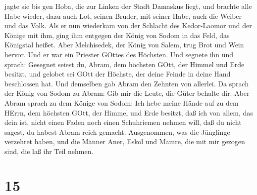 jagte sie bis gen Hoba, die zur Linken der Stadt Damaskus liegt,
 und brachte alle Habe wieder, dazu auch Lot, seinen
Bruder, mit seiner Habe, auch die Weiber und das Volk.  Als
er nun wiederkam von der Schlacht des Kedor-Laomor und der Könige mit
ihm, ging ihm entgegen der König von Sodom in das Feld, das Königstal
heißet.  Aber Melchisedek, der König von Salem, trug Brot
und Wein hervor. Und er war ein Priester GOttes des Höchsten.
 Und segnete ihn und sprach: Gesegnet seiest du, Abram, dem
höchsten GOtt, der Himmel und Erde besitzt,  und gelobet
sei GOtt der Höchste, der deine Feinde in deine Hand beschlossen hat.
Und demselben gab Abram den Zehnten von allerlei.  Da
sprach der König von Sodom zu Abram: Gib mir die Leute, die Güter
behalte dir.  Aber Abram sprach zu dem Könige von Sodom:
Ich hebe meine Hände auf zu dem HErrn, dem höchsten GOtt, der Himmel und
Erde besitzt,  daß ich von allem, das dein ist, nicht einen
Faden noch einen Schuhriemen nehmen will, daß du nicht sagest, du habest
Abram reich gemacht.  Ausgenommen, was die Jünglinge
verzehret haben, und die Männer Aner, Eskol und Mamre, die mit mir
gezogen sind, die laß ihr Teil nehmen.

\hypertarget{section-14}{%
\section{15}\label{section-14}}

